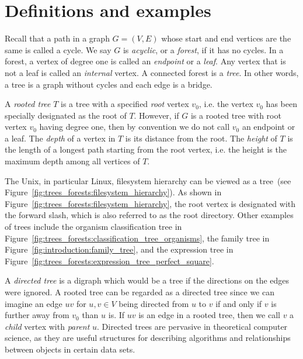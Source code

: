 \section{Definitions and examples}

Recall that a path in a graph $G = (V, E)$ whose start and end vertices
are the same is called a cycle. We say $G$ is
\emph{acyclic}, or a \emph{forest}, if it
has no cycles. In a forest, a vertex of degree one is called an
\emph{endpoint} or a \emph{leaf}. Any
vertex that is not a leaf is called an \emph{internal} vertex. A
connected forest is a \emph{tree}. In other words, a tree
is a graph without cycles and each edge is a bridge.

A \emph{rooted tree} $T$ is a tree with
a specified \emph{root} vertex $v_0$, i.e. the vertex
$v_0$ has been specially designated as the root of $T$. However, if
$G$ is a rooted tree with root vertex $v_0$ having degree one, then by
convention we do not call $v_0$ an endpoint or a leaf. The
\emph{depth} of a vertex in $T$ is its distance from the root. The
\emph{height} of $T$ is the length of a longest path starting from the
root vertex, i.e. the height is the maximum depth among all vertices
of $T$.

The Unix, in particular Linux,
filesystem hierarchy can be viewed as a tree~(see
Figure~\ref{fig:trees_forests:filesystem_hierarchy}). As shown in
Figure~\ref{fig:trees_forests:filesystem_hierarchy}, the root
vertex is designated with the forward slash, which
is also referred to as the root
directory. Other examples of trees include the
organism classification tree in
Figure~\ref{fig:trees_forests:classification_tree_organisms}, the
family tree in
Figure~\ref{fig:introduction:family_tree}, and the
expression tree in
Figure~\ref{fig:trees_forests:expression_tree_perfect_square}.

A \emph{directed tree} is a digraph which would
be a tree if the directions on the edges were ignored. A rooted tree
can be regarded as a directed tree since we can imagine an edge $uv$
for $u,v \in V$ being directed from $u$ to $v$ if and only if $v$ is
further away from $v_0$ than $u$ is. If $uv$ is an edge in a rooted
tree, then we call $v$ a \emph{child} vertex with
\emph{parent} $u$. Directed trees are pervasive in
theoretical computer science, as they are useful structures for
describing algorithms and relationships between objects in certain
data sets.

